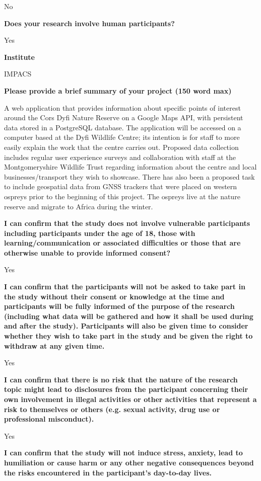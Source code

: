 No

\textbf{Does your research involve human participants?}

Yes

\textbf{Institute}

IMPACS

\textbf{Please provide a brief summary of your project (150 word max)}

A web application that provides information about specific points of interest around the
Cors Dyfi Nature Reserve on a Google Maps API, with persistent data stored in a
PostgreSQL database. The application will be accessed on a computer based at the Dyfi
Wildlife Centre; its intention is for staff to more easily explain the work that the centre
carries out. Proposed data collection includes regular user experience surveys and
collaboration with staff at the Montgomeryshire Wildlife Trust regarding information
about the centre and local businesses/transport they wish to showcase. There has also
been a proposed task to include geospatial data from GNSS trackers that were placed on
western ospreys prior to the beginning of this project. The ospreys live at the nature
reserve and migrate to Africa during the winter.

\textbf{I can confirm that the study does not involve vulnerable participants including participants under the age of 18, those with learning/communication or associated difficulties or those that are otherwise unable to provide informed consent?}

Yes

\textbf{I can confirm that the participants will not be asked to take part in the study without their consent or knowledge at the time and participants will be fully informed of the purpose of the research (including what data will be gathered and how it shall be used during and after the study). Participants will also be given time to consider whether they wish to take part in the study and be given the right to  withdraw at any given time.}

Yes

\textbf{I can confirm that there is no risk that the nature of the research topic might lead to disclosures from the participant concerning their own involvement in illegal activities or other activities that represent a risk to themselves or others (e.g. sexual activity, drug use or professional misconduct).}

Yes

\textbf{I can confirm that the study will not induce stress, anxiety, lead to humiliation or cause harm or any other negative consequences beyond the risks encountered in the participant’s day-to-day lives.}


